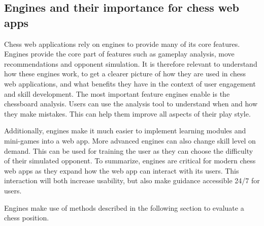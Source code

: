 \subsection{Engines and their importance for chess web apps}\label{subsec:webapps-engines}

Chess web applications rely on engines to provide many of its core features.
Engines provide the core part of features such as gameplay analysis,
move recommendations and opponent simulation.
It is therefore relevant to understand how these engines work,
to get a clearer picture of how they are used in chess web applications,
and what benefits they have in the context of user engagement and skill
development.
The most important feature engines enable is the chessboard analysis.
Users can use the analysis tool to understand when and how they make mistakes.
This can help them improve all aspects of their play style.

Additionally, engines make it much easier to implement learning modules
and mini-games into a web app.
More advanced engines can also change skill level on demand.
This can be used for training the user as they can choose the difficulty of
their simulated opponent.
To summarize, engines are critical for modern chess web apps as they
expand how the web app can interact with its users.
This interaction will both increase usability, but also make guidance accessible
24/7 for users.

Engines make use of methods described in the following section to evaluate a chess position.
